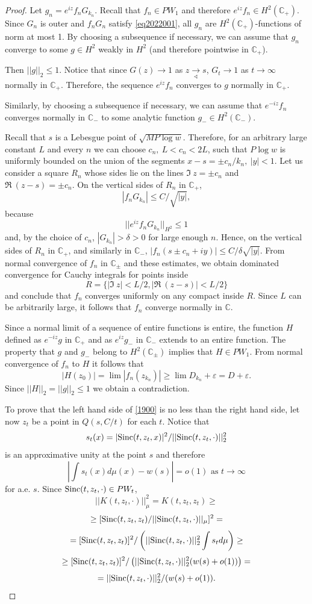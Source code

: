\documentclass[11pt,twoside,reqno]{amsart}
\def\to{\rightarrow}
\def \To{\underset
\sphericalangle\longrightarrow}
\def\C{{\mathbb{C}}}
\def\e{\varepsilon}
\def\S{\text{\rm Sinc}}
\theoremstyle{plain}
\numberwithin{equation}{section}
\begin{document}
\begin{proof}
Let $g_n=e^{iz}f_nG_{k_n}$. 
Recall that $f_n\in PW_1$ and therefore $e^{iz}f_n\in H^2(\C_+)$. Since $G_n$ is outer and $f_nG_n$ satisfy  \eqref{eq2022001},
all $g_n$ are $H^2(\C_+)$-functions of norm at most 1.
By choosing a subsequence if necessary, we can assume that $g_n$ converge to some $g\in H^2$ weakly in $H^2$ (and therefore pointwise in $\C_+$).


Then
$||g||_2\leq 1$. Notice that since $G(z)\to 1$ as $z\To s$, $G_t\to 1$ as $t\to \infty$
normally in $\C_+$. Therefore, the sequence $e^{iz}f_n$ converges to $g$ normally in $\C_+$.


Similarly, by choosing a subsequence if necessary, we can assume that  $e^{-iz}f_n$ converges normally in $\C_-$ to some analytic function $g_-\in H^2(\C_-)$.


Recall that $s$ is a Lebesgue point of $\sqrt{MP\log w}$. Therefore, for an arbitrary large constant $L$ and every $n$ we can choose
 $c_n,\ L<c_n<2L$, such that $P\log w$ is uniformly bounded  on the union of the segments $x-s=\pm c_n/k_n,\ |y|<1$.
Let us consider a square $R_n$ whose sides lie on the lines $\Im\  z=\pm c_n$ and $\Re\  (z-s)=\pm c_n$.
On the vertical sides of $R_n$ in $\C_+$, $$|f_nG_{k_n}|\leq C/\sqrt {|y|},$$ because $$||e^{iz}f_nG_{k_n}||_{H^2}\leq 1$$ and, by the choice of $c_n$, $|G_{k_n}|>\delta>0$ for large enough $n$.
Hence, on the vertical sides of $R_n$ in $\C_+$, and similarly in $\C_-$,  $|f_n(s\pm c_n +i y)|\leq C/\delta \sqrt {|y|}$.
From normal convergence of $f_n$ in $\C_\pm$ and these estimates, we obtain dominated convergence for Cauchy integrals for points
inside $$R=\{|\Im\  z|<L/2,|\Re\  (z-s)|<L/2\}$$ and conclude that $f_n$ converges uniformly on any compact inside $R$. Since $L$ can be arbitrarily large,
it follows that $f_n$ converge normally in $\C$.

Since a
normal limit of a sequence of entire functions is entire, the function $H$ defined as $e^{-iz}g$ in $\C_+$ and as $e^{iz}g_-$ in $\C_-$ extends to an entire function.
The property that $g$ and $g_-$ belong to $H^2(\C_\pm)$ implies that $H\in PW_1$.
From normal convergence of $f_n$ to $H$ it follows that
$$|H(z_0)|=\lim |f_n(z_{k_n})|\geq \lim D_{k_n}+\e=D+\e.$$
Since $||H||_2=||g||_2\leq 1$
we obtain a contradiction.

To prove that the left hand side of \eqref{1900} is no less than the right hand side, let now $z_t$ be a point
in $Q(s,C/t)$ for each $t$. Notice that $$s_t(x)=|\S(t,z_t, x)|^2/||\S(t,z_t, \cdot)||^2_2$$ is an approximative unity at the point $s$ and therefore
$$\left|\int s_t(x) d\mu(x) -w(s)\right| =o(1)\text{ as } t\to\infty$$
for a.e. $s$. Since $\S(t,z_t,\cdot)\in PW_t$,
$$||K(t,z_t, \cdot)||^2_{\mu}=K(t,z_t,z_t)\geq $$$$
\geq[\S(t,z_t,z_t)/||\S(t,z_t,\cdot)||_\mu]^2=$$$$
=[\S(t,z_t,z_t)]^2/\left(||\S(t,z_t, \cdot)||^2_2\int s_t d\mu\right)  \geq $$$$
\geq [\S(t,z_t,z_t)]^2/\left(||\S(t,z_t, \cdot)||^2_2(w(s)+o(1))\right)=$$$$
=||\S(t,z_t, \cdot)||^2_2/(w(s)+o(1)).
$$




\end{proof}
\end{document}
